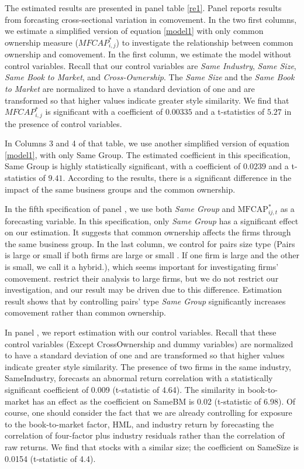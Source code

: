 	
The estimated results are presented in panel table \ref{re1}. Panel  reports results from forcasting cross-sectional variation in comovement.
In the two first columns, we estimate a simplified version of equation \ref{model1} with only common ownership measure ($ MFCAP^*_{i,j}$) to investigate the relationship between common ownership and comovement. In the first column, we estimate the model without control variables. Recall that our control variables are \textit{Same Industry}, \textit{Same Size}, \textit{Same Book to Market}, and \textit{Cross-Ownership}. The \textit{Same Size} and the \textit{Same Book to Market} are normalized to have a standard deviation of one and are transformed so that higher values indicate greater style similarity. We find that $ MFCAP^*_{i,j}$ is significant with a coefficient of $0.00335$ and a t-statistics of $5.27$ in the presence of control variables. 
		
		
		In Columns 3 and 4 of that table, we use another simplified version of equation \ref{model1}, with only Same Group. The estimated coefficient in this specification, Same Group is highly statistically significant, with a coefficient of   $0.0239$ and a t-statistics of $9.41$. According to the results, there is a significant difference in the impact of the same business groups and the common ownership. 
		
		In the fifth specification of panel , we use both \textit{Same Group}  and $\text{MFCAP}^*_{ij,t}$ as a forecasting variable. In this specification, only  \textit{Same Group} has a significant effect on our estimation. It suggests that common ownership affects the firms through the same business group. In the last column, we control for pairs size type (Pairs is large or small if both firms are large or small . If one firm is large and the other is small, we call it a hybrid.), which seems important for investigating firms' comovement.	\cite{AntonPolk} restrict their analysis to large firms, but we do not restrict our investigation, and our result may be driven due to this difference. Estimation result shows that by controlling pairs' type \textit{Same Group} significantly increases comovement rather than common ownership.
	
	In panel , we report estimation with our control variables. Recall that these control variables (Except CrossOwnership and dummy variables) are normalized to have a standard deviation of one and are transformed so that higher values indicate greater style similarity. The presence of two firms in the same industry, SameIndustry, forecasts an abnormal return correlation with a statistically significant coefficient of 0.009 (t-statistic of 4.64). The similarity in book-to-market has an effect as the coefficient on SameBM is 0.02 (t-statistic of 6.98). Of course, one should consider the fact that we are already controlling for exposure to the book-to-market factor, HML, and industry return by forecasting the correlation of four-factor plus industry residuals rather than the correlation of raw returns. We find that stocks with a similar size; the coefficient on SameSize is 0.0154 (t-statistic of 4.4). 
	

